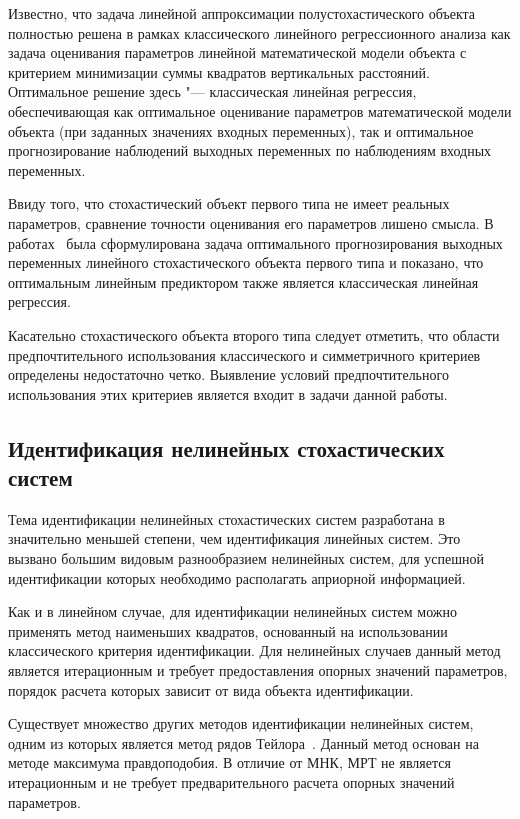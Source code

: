 Известно, что задача линейной аппроксимации полустохастического объекта полностью решена в
рамках классического линейного регрессионного анализа как задача оценивания параметров
линейной математической модели объекта с критерием минимизации суммы квадратов вертикальных расстояний.
Оптимальное решение здесь "--- классическая линейная регрессия,
обеспечивающая как оптимальное оценивание параметров математической модели объекта
(при заданных значениях входных переменных),
так и оптимальное прогнозирование наблюдений выходных переменных по наблюдениям входных переменных.

Ввиду того, что стохастический объект первого типа не имеет реальных параметров,
сравнение точности оценивания его параметров лишено смысла.
В работах~\cite{mukha_2010, mukha_2011} была сформулирована задача оптимального прогнозирования
выходных переменных линейного стохастического объекта первого типа и показано,
что оптимальным линейным предиктором также является классическая линейная регрессия.

Касательно стохастического объекта второго типа следует отметить,
что области предпочтительного использования классического и симметричного критериев
определены недостаточно четко.
Выявление условий предпочтительного использования этих критериев является
входит в задачи данной работы.

\vspace{2\baselineskip}
\subsection{Идентификация нелинейных стохастических систем}

Тема идентификации нелинейных стохастических систем разработана в
значительно меньшей степени, чем идентификация линейных систем.
Это вызвано большим видовым разнообразием нелинейных систем,
для успешной идентификации которых необходимо располагать априорной информацией.

Как и в линейном случае, для идентификации нелинейных систем можно применять
метод наименьших квадратов, основанный на использовании классического критерия идентификации.
Для нелинейных случаев данный метод является итерационным и
требует предоставления опорных значений параметров,
порядок расчета которых зависит от вида объекта идентификации.

Существует множество других методов идентификации нелинейных систем,
одним из которых является метод рядов Тейлора~\cite{mukha_2000}.
Данный метод основан на методе максимума правдоподобия.
В отличие от МНК, МРТ не является итерационным и не требует предварительного расчета
опорных значений параметров.

